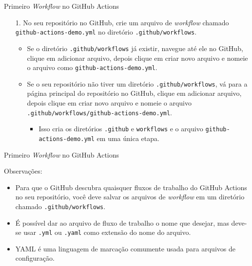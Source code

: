 \documentclass[t,serif]{beamer}
\begin{document}
	\begin{frame}{Primeiro \textit{Workflow} no GitHub Actions}
		\begin{enumerate}
			\item[1.] No seu repositório no GitHub, crie um arquivo de \textit{workflow} chamado \texttt{github-actions-demo.yml} no diretório \texttt{.github/workflows}.
			\vspace{0.2cm}
			\begin{itemize}
				\item Se o diretório \texttt{.github/workflows} já existir, navegue até ele no GitHub, clique em adicionar arquivo, depois clique em criar novo arquivo e nomeie o arquivo como \texttt{github-actions-demo.yml}.
				\vspace{0.2cm}
				\item Se o seu repositório não tiver um diretório \texttt{.github/workflows}, vá para a página principal do repositório no GitHub, clique em adicionar arquivo, depois clique em criar novo arquivo e nomeie o arquivo \texttt{.github/workflows/github-actions-demo.yml}.
				\begin{itemize}
					\item Isso cria os diretórios \texttt{.github} e \texttt{workflows} e o arquivo \texttt{github-actions-demo.yml} em uma única etapa.
				\end{itemize}
			\end{itemize}
		\end{enumerate}
	\end{frame}
	
	\begin{frame}{Primeiro \textit{Workflow} no GitHub Actions}
		\vspace{1cm}
		\begin{block}{Observações:}
			\begin{itemize}
				\item Para que o GitHub descubra quaisquer fluxos de trabalho do GitHub Actions no seu repositório, você deve salvar os arquivos de \textit{workflow} em um diretório chamado \texttt{.github/workflows}.
				\item É possível dar ao arquivo de fluxo de trabalho o nome que desejar, mas deve-se usar \texttt{.yml} ou \texttt{.yaml} como extensão do nome do arquivo.
				\item YAML é uma linguagem de marcação comumente usada para arquivos de configuração.
			\end{itemize}
		\end{block}
	\end{frame}
	
\end{document}
